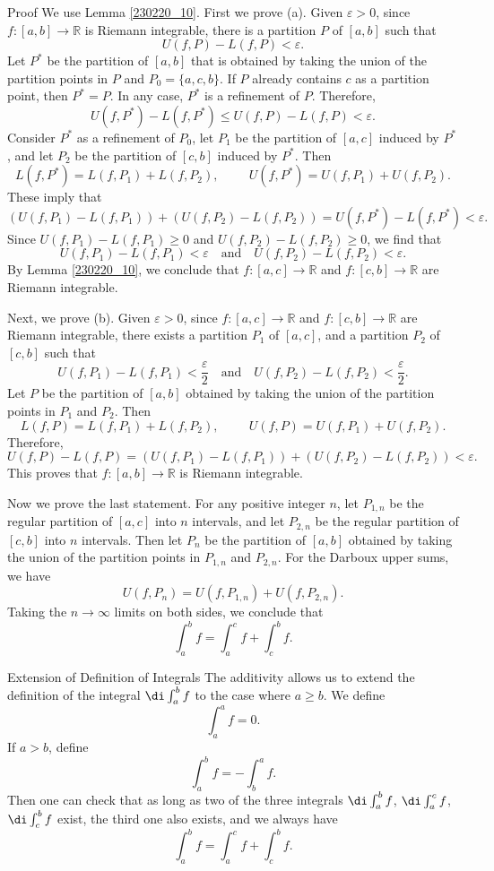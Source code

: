 \begin{myproof}{Proof}
We use  Lemma \ref{230220_10}.  First we prove (a). Given $\varepsilon>0$, since $f:[a,b]\to\mathbb{R}$ is Riemann integrable, there is a partition $P$ of $[a,b]$ such that
\[U(f,P)-L(f,P)<\varepsilon.\]
Let $P^*$ be the partition of $[a,b]$ that is obtained  by taking the union of the partition points in $P$ and $P_0=\{a, c, b\}$. If $P$ already contains $c$ as a partition point, then $P^*=P$. In any case, $P^*$ is a refinement of $P$.   Therefore,
\[U(f,P^*)-L(f,P^*)\leq U(f,P)-L(f,P)<\varepsilon.\]
Consider $P^*$ as a refinement of $P_0$, let $P_1$ be the partition of $[a,c]$   induced by $P^*$, and let $P_2$ be the partition of $[c, b]$ induced by $P^*$. Then
\[L(f,P^*)=L(f,P_1)+L(f,P_2), \hspace{1cm}U(f,P^*)=U(f,P_1)+U(f,P_2).\]
These imply that
\[(U(f,P_1)-L(f,P_1))+(U(f,P_2)-L(f,P_2))=U(f,P^*)-L(f,P^*)<\varepsilon.\]
\bp Since $U(f,P_1)-L(f,P_1)\geq 0$ and $U(f,P_2)-L(f,P_2)\geq 0$, we find that
\[U(f,P_1)-L(f,P_1)<\varepsilon\quad\text{and}\quad U(f,P_2)-L(f,P_2)<\varepsilon.\]
By Lemma \ref{230220_10},  we conclude that $f:[a,c]\to\mathbb{R}$  and $f:[c,b]\to\mathbb{R}$  are Riemann integrable.
 
Next, we prove (b). Given $\varepsilon>0$,  since $f:[a,c]\to\mathbb{R}$  and $f:[c,b]\to\mathbb{R}$  are Riemann integrable, there exists a partition $P_1$ of $[a,c]$, and a partition $P_2$ of $[c,b]$ such that 
\[U(f,P_1)-L(f,P_1)<\frac{\varepsilon}{2}\quad\text{and}\quad U(f,P_2)-L(f,P_2)<\frac{\varepsilon}{2}.\]
Let $P$ be the partition of $[a,b]$ obtained by taking the union of the partition points in $P_1$ and $P_2$. Then 
\[L(f,P )=L(f,P_1)+L(f,P_2), \hspace{1cm}U(f,P )=U(f,P_1)+U(f,P_2).\]Therefore,
\[U(f,P)-L(f,P)=(U(f,P_1)-L(f,P_1))+(U(f,P_2)-L(f,P_2))<\varepsilon.\]
This proves that $f:[a,b]\to\mathbb{R}$ is Riemann integrable.

Now we prove the last statement.
For any positive integer $n$,   let $P_{1,n}$ be the regular partition of $[a,c]$ into $n$ intervals, and let $P_{2,n}$ be the regular partition of $[c,b]$ into $n$ intervals. Then let $P_n$ be the partition of $[a,b]$ obtained by taking the union of the partition points in $P_{1,n}$ and $P_{2,n}$.  For the Darboux upper sums, we have 
\[U(f,P_n)=U(f,P_{1,n})+U(f,P_{2,n}).\] 
Taking the $n\to \infty$ limits on both sides, we conclude that
\[\int_a^b f=\int_a^c f+\int_c^b f.\]
\end{myproof}
\begin{highlight}{Extension of Definition of Integrals}
The additivity allows us to extend the definition of the integral $\di \int_a^b f$ to the case where $a\geq b$. We define
\[\int_a^a f=0.\] If $a>b$, define
\[\int_a^b f=-\int_b^a f.\]
Then one can check that 
as long as two of the three  integrals $\di\int_a^b f$, $\di \int_a^cf$, $\di \int_c^bf$ exist, the third one also exists, and we always have
\[\int_a^b f=\int_a^c f+\int_c^b f.\]

\end{highlight}


